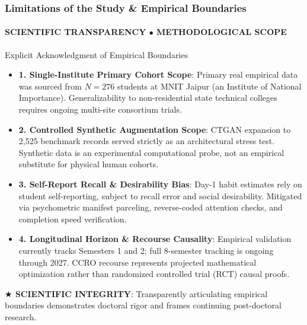 \documentclass[aspectratio=169, 10pt]{beamer}
\newcommand{\leadbullet}[2]{\textbf{\color{NavyDark}#1}: \color{TextBody}#2}
\begin{document}
\begin{frame}
  \frametitle{Limitations of the Study \& Empirical Boundaries}
  \framesubtitle{SCIENTIFIC TRANSPARENCY $\bullet$ METHODOLOGICAL SCOPE}

  \begin{defensecard}{Explicit Acknowledgment of Empirical Boundaries}
    \begin{itemize}\setlength{\itemsep}{2.5pt}\setlength{\parskip}{0pt}\fontsize{8.2pt}{10.2pt}\selectfont
      \item \leadbullet{1. Single-Institute Primary Cohort Scope}{Primary real empirical data was sourced from $N=276$ students at MNIT Jaipur (an Institute of National Importance). Generalizability to non-residential state technical colleges requires ongoing multi-site consortium trials.}
      \item \leadbullet{2. Controlled Synthetic Augmentation Scope}{CTGAN expansion to 2,525 benchmark records served strictly as an architectural stress test. Synthetic data is an experimental computational probe, not an empirical substitute for physical human cohorts.}
      \item \leadbullet{3. Self-Report Recall \& Desirability Bias}{Day-1 habit estimates rely on student self-reporting, subject to recall error and social desirability. Mitigated via psychometric manifest parceling, reverse-coded attention checks, and completion speed verification.}
      \item \leadbullet{4. Longitudinal Horizon \& Recourse Causality}{Empirical validation currently tracks Semesters 1 and 2; full 8-semester tracking is ongoing through 2027. CCRO recourse represents projected mathematical optimization rather than randomized controlled trial (RCT) causal proofs.}
    \end{itemize}
  \end{defensecard}
  \vspace{-0.1cm}

  \begin{takeawaybanner}
    \textbf{\color{GoldPill}$\bigstar$ SCIENTIFIC INTEGRITY}: Transparently articulating empirical boundaries demonstrates doctoral rigor and frames continuing post-doctoral research.
  \end{takeawaybanner}
\end{frame}
\end{document}
